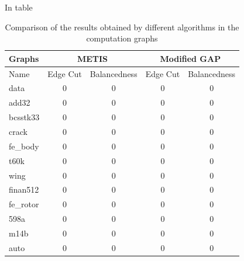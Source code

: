 In table 

\begin{table}[h!]
\centering
\begin{tabular}{ |p{1.75cm}||cc|cc||  }
\hline
\hline
\textbf{Graphs} & \multicolumn{2}{|c|}{\textbf{METIS}} & \multicolumn{2}{|c|}{\textbf{Modified GAP}}  \\
\hline
\hline
Name & Edge Cut & Balancedness & Edge Cut & Balancedness \\
\hline
data & 0 & 0 & 0 & 0  \\
add32 & 0 & 0 & 0 & 0  \\
bcsstk33 & 0 & 0 & 0 & 0  \\
crack & 0 & 0 & 0 & 0  \\
\hline
fe\_body & 0 & 0 & 0 & 0   \\
t60k & 0 & 0 & 0 & 0  \\
wing & 0 & 0 & 0 & 0  \\
finan512 & 0 & 0 & 0 & 0  \\
\hline
fe\_rotor & 0 & 0 & 0 & 0  \\
598a & 0 & 0 & 0 & 0  \\
m14b & 0 & 0 & 0 & 0  \\
auto & 0 & 0 & 0 & 0  \\
\hline
\end{tabular}
\caption{\label{tab:comp_graphs}Comparison of the results obtained by different algorithms in the computation graphs}
\end{table}

